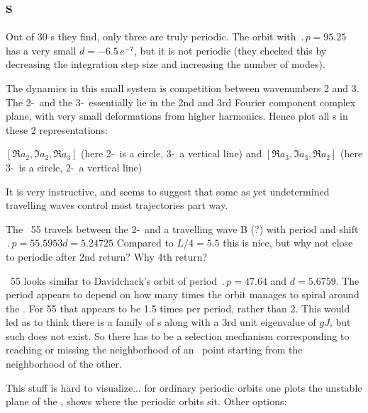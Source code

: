 
\subsection{\Rpo s}

%
Out of 30 \rpo s they
find,  only three are truly periodic.  The orbit
with $\period{p} = 95.25$ has a very small
$d = -6.5\,e^{-7}$, but it is not periodic 
(they
checked this by decreasing the integration step size and increasing the
number of modes).

The dynamics in this small system is competition between wavenumbers
2 and 3. The 2-\eqv\  and the 3-\eqv\  essentially lie in
the 2nd and 3rd Fourier component complex plane, with very
small deformations from higher harmonics.
Hence plot all \rpo s in these 2 representations:

$[ \Re a_2, \Im a_2, \Re a_3 ]$
(here 2-\eqv\  is a circle, 3-\eqv\ a vertical line)
 and
$[ \Re a_3, \Im a_3, \Re a_2 ]$
(here 3-\eqv\ is a circle, 2-\eqv\ a vertical line)

It is very instructive, and seems to suggest that some as yet
undetermined travelling waves control most trajectories part way.

The \rpo\ {\nameit}55 travels between the 2-\eqv\  and a
travelling wave B (?) 
with period and shift
$\period{p}=55.5953 d=5.24725$
Compared to $L/4 = 5.5$
this is nice, but why not close to periodic after 2nd return? Why 4th return?

\Rpo\ {\nameit}55 looks similar to Davidchack's  orbit
of period 
$\period{p}=47.64$ and $d=5.6759$. The period appears to depend on how
many times the orbit manages to spiral around the \eqv.
For {\nameit}55 that appears to be
1.5 times per period, rather than 2. This would led as
to
think there is a family of \rpo s along with a 3rd unit eigenvalue of
$gJ$,
but such does not exist.
So there has to be a selection mechanism corresponding to
reaching or missing the neighborhood of an \eqv\  point starting from
the neighborhood of the other. 

This stuff is hard to visualize... for ordinary periodic orbits one
plots the unstable plane of the \eqv, shows where the periodic
orbits sit. Other options:

